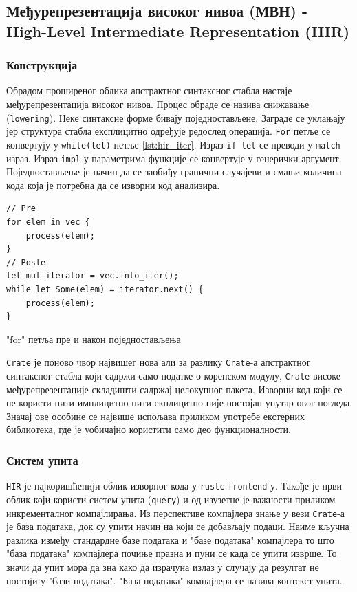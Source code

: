 \subsection{Међурепрезентација високог нивоа (МВН) - High-Level Intermediate Representation (HIR)}

\subsubsection{Конструкција}

Обрадом проширеног облика апстрактног синтаксног стабла настаје међурепрезентација високог нивоа.
Процес обраде се назива снижавање (\verb|lowering|). Неке синтаксне форме бивају поједностављене.
Заграде се уклањају јер структура стабла експлицитно одређује редослед операција. \verb|For| петље 
се конвертују у \verb|while(let)| петље \ref{lst:hir_iter}. Израз \verb|if let| се преводи 
у \verb|match| израз. Израз \verb|impl| у параметрима функције се конвертује у генерички аргумент.
Поједностављење је начин да се заобиђу гранични случајеви и смањи количина кода која је потребна 
да се изворни код анализира.

\begin{listing}[H]
\begin{verbatim}
// Pre
for elem in vec {
    process(elem);
}
// Posle
let mut iterator = vec.into_iter();
while let Some(elem) = iterator.next() {
    process(elem);
}
\end{verbatim}
\caption{"for" петља пре и након поједностављења}
\label{lst:hir_iter}
\end{listing}

\verb|Crate| је поново чвор највишег нова али за разлику \verb|Crate|-а апстрактног синтаксног стабла који садржи
само податке о коренском модулу, \verb|Crate| високе међурепрезентације складишти садржај целокупног пакета.
Изворни код који се не користи нити имплицитно нити екплицитно није постојан унутар овог погледа. Значај 
ове особине се највише испољава приликом употребе екстерних библиотека, где је уобичајно користити само 
део функционалности.

\subsubsection{Систем упита}

\verb|HIR| је најкоришћенији облик изворног кода у \verb|rustc| \verb|frontend|-у. Такође је први облик који 
користи систем упита (\verb|query|) и од изузетне је важности приликом инкременталног компајлирања.
Из перспективе компајлера знање у вези \verb|Crate|-а је база података, док су упити начин на који 
се добављају подаци. Наиме кључна разлика између стандардне базе података и "базе података" компајлера
то што "база података" компајлера почиње празна и пуни се када се упити изврше. То значи да упит мора 
да зна како да израчуна излаз у случају да резултат не постоји у "бази података". "База података" компајлера 
се назива контекст упита.

